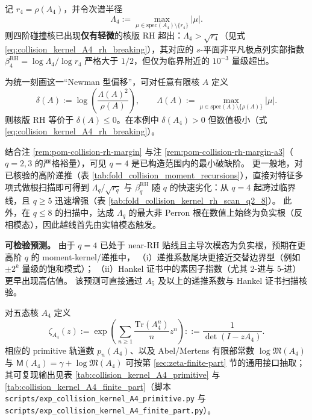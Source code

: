 




\begin{remark}\label{rem:pom-collision-rh-break-a4}
记 \(r_4=\rho(A_4)\)，并令次谱半径
\[
\Lambda_4:=\max_{\mu\in\mathrm{spec}(A_4)\setminus\{r_4\}}|\mu|.
\]
 则四阶碰撞核已出现\textbf{仅有轻微}的核版 RH 超出：\(\Lambda_4>\sqrt{r_4}\)（见式 \ref{eq:collision_kernel_A4_rh_breaking}），其对应的 \(s\)-平面非平凡极点列实部指数
\(
\beta^{\mathrm{RH}}_4=\log\Lambda_4/\log r_4
\)
 严格大于 \(1/2\)，但仅为临界附近的 \(10^{-3}\) 量级超出。
\par
为统一刻画这一“Newman 型偏移”，可对任意有限核 \(A\) 定义
\[
\delta(A):=\log\!\left(\frac{\Lambda(A)^2}{\rho(A)}\right),
\qquad
\Lambda(A):=\max_{\mu\in\mathrm{spec}(A)\setminus\{\rho(A)\}}|\mu|.
\]
则核版 RH 等价于 \(\delta(A)\le 0\)。在本例中 \(\delta(A_4)>0\) 但数值极小（式 \ref{eq:collision_kernel_A4_rh_breaking}）。
\par
结合注 \ref{rem:pom-collision-rh-margin} 与注 \ref{rem:pom-collision-rh-margin-a3}（\(q=2,3\) 的严格裕量），可见 \(q=4\) 是已构造范围内的最小破缺阶。
更一般地，对已核验的高阶递推（表 \ref{tab:fold_collision_moment_recursions}），直接对特征多项式做根扫描即可得到
\(\Lambda_q/\sqrt{r_q}\) 与 \(\beta^{\mathrm{RH}}_q\) 随 \(q\) 的快速劣化：从 \(q=4\) 起跨过临界线，且 \(q\ge 5\) 迅速增强（表 \ref{tab:fold_collision_kernel_rh_scan_q2_8}）。
此外，在 \(q\le 8\) 的扫描中，达成 \(\Lambda_q\) 的最大非 Perron 根在数值上始终为负实根（反相模态），因此越线首先由实轴模态触发。
\par
\textbf{可检验预测。} 由于 \(q=4\) 已处于 near-RH 贴线且主导次模态为负实根，预期在更高阶 \(q\) 的 moment-kernel/递推中，
（i）递推系数尾块更接近交替边界型（例如 \(\pm 2^k\) 量级的饱和模式）；
（ii）Hankel 证书中的素因子指数（尤其 2-进与 5-进）更早出现高估值。
该预测可直接通过 \(A_5\) 及以上的递推系数与 Hankel 证书扫描核验。
\end{remark}





\begin{definition}\label{def:pom-collision-zeta-a4}
对五态核 \(A_4\) 定义
$$
\zeta_{A_4}(z):=\exp\!\left(\sum_{n\ge 1}\frac{\mathrm{Tr}(A_4^n)}{n}z^n\right)
::=\frac{1}{\det(I-zA_4)}.
$$
相应的 primitive 轨道数 \(p_n(A_4)\)、以及 Abel/Mertens 有限部常数 \(\log\mathfrak{M}(A_4)\) 与 \(\mathsf{M}(A_4)=\gamma+\log\mathfrak{M}(A_4)\) 可按第 \ref{sec:zeta-finite-part} 节的通用接口抽取；其可复现输出见表 \ref{tab:collision_kernel_A4_primitive} 与 \ref{tab:collision_kernel_A4_finite_part}（脚本 \texttt{scripts/exp\_collision\_kernel\_A4\_primitive.py} 与 \texttt{scripts/exp\_collision\_kernel\_A4\_finite\_part.py}）。
\end{definition}

